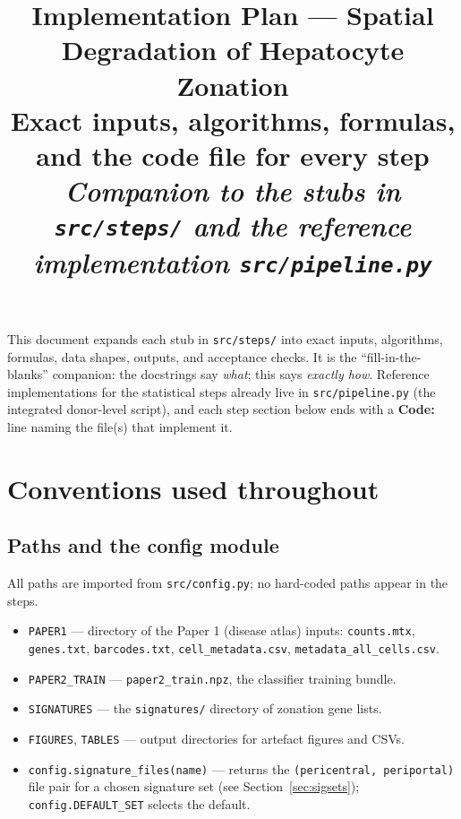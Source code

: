 \documentclass[11pt]{article}
\title{\vspace{-2em}\textbf{Implementation Plan --- Spatial Degradation of Hepatocyte Zonation}\\[0.3em]\large Exact inputs, algorithms, formulas, and the code file for every step\\[0.4em]\normalsize\textit{Companion to the stubs in \texttt{src/steps/} and the reference implementation \texttt{src/pipeline.py}}}
\author{}\date{}
\newcommand{\code}[1]{\texttt{\small #1}}
\begin{document}
\maketitle
\tableofcontents

\bigskip

This document expands each stub in \code{src/steps/} into exact inputs, algorithms, formulas, data
shapes, outputs, and acceptance checks. It is the ``fill-in-the-blanks'' companion: the docstrings
say \emph{what}; this says \emph{exactly how}. Reference implementations for the statistical steps
already live in \code{src/pipeline.py} (the integrated donor-level script), and each step section
below ends with a \textbf{Code:} line naming the file(s) that implement it.

\section{Conventions used throughout}

\subsection{Paths and the config module}
All paths are imported from \code{src/config.py}; no hard-coded paths appear in the steps.

\begin{itemize}[leftmargin=1.4em]
  \item \code{PAPER1} --- directory of the Paper 1 (disease atlas) inputs:
        \code{counts.mtx}, \code{genes.txt}, \code{barcodes.txt}, \code{cell\_metadata.csv},
        \code{metadata\_all\_cells.csv}.
  \item \code{PAPER2\_TRAIN} --- \code{paper2\_train.npz}, the classifier training bundle.
  \item \code{SIGNATURES} --- the \code{signatures/} directory of zonation gene lists.
  \item \code{FIGURES}, \code{TABLES} --- output directories for artefact figures and CSVs.
  \item \code{config.signature\_files(name)} --- returns the
        \code{(pericentral, periportal)} file pair for a chosen signature set
        (see Section~\ref{sec:sigsets}); \code{config.DEFAULT\_SET} selects the default.
\end{itemize}
\end{document}
